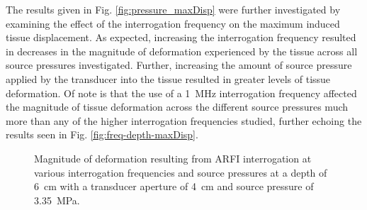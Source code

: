 			The results given in Fig. \ref{fig:pressure_maxDisp} were further investigated by examining the effect of the interrogation frequency on the maximum induced tissue displacement. As expected, increasing the interrogation frequency resulted in decreases in the magnitude of deformation experienced by the tissue across all source pressures investigated. Further, increasing the amount of source pressure applied by the transducer into the tissue resulted in greater levels of tissue deformation. Of note is that the use of a \SI{1}{\MHz} interrogation frequency affected the magnitude of tissue deformation across the different source pressures much more than any of the higher interrogation frequencies studied, further echoing the results seen in Fig. \ref{fig:freq-depth-maxDisp}.

			\begin{figure}[!htb]
				\centering
				\caption[ARFI-induced deformation across various interrogation frequencies and source pressures]{Magnitude of deformation resulting from ARFI interrogation at various interrogation frequencies and source pressures at a depth of \SI{6}{\cm} with a transducer aperture of \SI{4}{\cm} and source pressure of \SI{3.35}{\MPa}.}
				\label{fig:freq_pressure_maxDisp}
			\end{figure}

